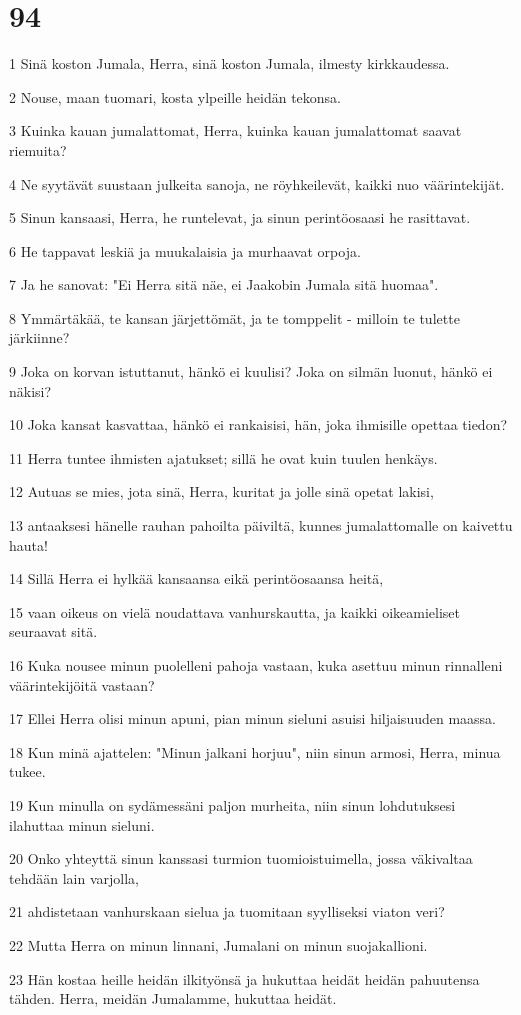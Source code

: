 \chapter{94}

\par 1 Sinä koston Jumala, Herra, sinä koston Jumala, ilmesty kirkkaudessa.
\par 2 Nouse, maan tuomari, kosta ylpeille heidän tekonsa.
\par 3 Kuinka kauan jumalattomat, Herra, kuinka kauan jumalattomat saavat riemuita?
\par 4 Ne syytävät suustaan julkeita sanoja, ne röyhkeilevät, kaikki nuo väärintekijät.
\par 5 Sinun kansaasi, Herra, he runtelevat, ja sinun perintöosaasi he rasittavat.
\par 6 He tappavat leskiä ja muukalaisia ja murhaavat orpoja.
\par 7 Ja he sanovat: "Ei Herra sitä näe, ei Jaakobin Jumala sitä huomaa".
\par 8 Ymmärtäkää, te kansan järjettömät, ja te tomppelit - milloin te tulette järkiinne?
\par 9 Joka on korvan istuttanut, hänkö ei kuulisi? Joka on silmän luonut, hänkö ei näkisi?
\par 10 Joka kansat kasvattaa, hänkö ei rankaisisi, hän, joka ihmisille opettaa tiedon?
\par 11 Herra tuntee ihmisten ajatukset; sillä he ovat kuin tuulen henkäys.
\par 12 Autuas se mies, jota sinä, Herra, kuritat ja jolle sinä opetat lakisi,
\par 13 antaaksesi hänelle rauhan pahoilta päiviltä, kunnes jumalattomalle on kaivettu hauta!
\par 14 Sillä Herra ei hylkää kansaansa eikä perintöosaansa heitä,
\par 15 vaan oikeus on vielä noudattava vanhurskautta, ja kaikki oikeamieliset seuraavat sitä.
\par 16 Kuka nousee minun puolelleni pahoja vastaan, kuka asettuu minun rinnalleni väärintekijöitä vastaan?
\par 17 Ellei Herra olisi minun apuni, pian minun sieluni asuisi hiljaisuuden maassa.
\par 18 Kun minä ajattelen: "Minun jalkani horjuu", niin sinun armosi, Herra, minua tukee.
\par 19 Kun minulla on sydämessäni paljon murheita, niin sinun lohdutuksesi ilahuttaa minun sieluni.
\par 20 Onko yhteyttä sinun kanssasi turmion tuomioistuimella, jossa väkivaltaa tehdään lain varjolla,
\par 21 ahdistetaan vanhurskaan sielua ja tuomitaan syylliseksi viaton veri?
\par 22 Mutta Herra on minun linnani, Jumalani on minun suojakallioni.
\par 23 Hän kostaa heille heidän ilkityönsä ja hukuttaa heidät heidän pahuutensa tähden. Herra, meidän Jumalamme, hukuttaa heidät.

